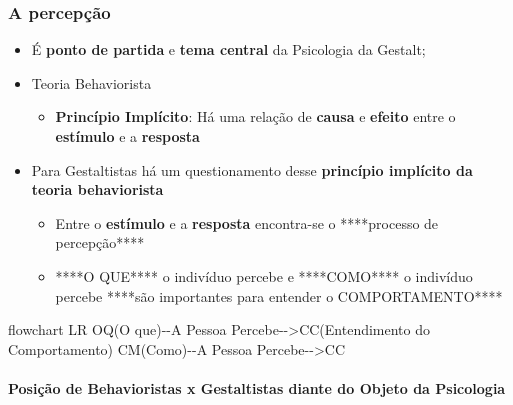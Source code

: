 \documentclass[
]{book}
\newenvironment{Shaded}{\begin{snugshade}}{\end{snugshade}}
\newcommand{\NormalTok}[1]{#1}
\providecommand{\tightlist}{%
  \setlength{\itemsep}{0pt}\setlength{\parskip}{0pt}}
\begin{document}
\hypertarget{a-percepuxe7uxe3o}{%
\subsubsection{A percepção}\label{a-percepuxe7uxe3o}}

\begin{itemize}
\tightlist
\item
  É \textbf{ponto de partida} e \textbf{tema central} da Psicologia da Gestalt;
\item
  Teoria Behaviorista

  \begin{itemize}
  \tightlist
  \item
    \textbf{Princípio Implícito}: Há uma relação de \textbf{causa} e \textbf{efeito} entre o \textbf{estímulo} e a \textbf{resposta}
  \end{itemize}
\item
  Para Gestaltistas há um questionamento desse \textbf{princípio implícito da teoria behaviorista}

  \begin{itemize}
  \tightlist
  \item
    Entre o \textbf{estímulo} e a \textbf{resposta} encontra-se o ****processo de percepção****
  \item
    ****O QUE**** o indivíduo percebe e ****COMO**** o indivíduo percebe ****são importantes para entender o COMPORTAMENTO****
  \end{itemize}
\end{itemize}

\begin{Shaded}
\begin{Highlighting}[]
\NormalTok{flowchart LR}
\NormalTok{OQ(O que){-}{-}A Pessoa Percebe{-}{-}\textgreater{}CC(Entendimento do Comportamento)}
\NormalTok{CM(Como){-}{-}A Pessoa Percebe{-}{-}\textgreater{}CC}
\end{Highlighting}
\end{Shaded}

\hypertarget{posiuxe7uxe3o-de-behavioristas-x-gestaltistas-diante-do-objeto-da-psicologia}{%
\paragraph{Posição de Behavioristas x Gestaltistas diante do Objeto da Psicologia}\label{posiuxe7uxe3o-de-behavioristas-x-gestaltistas-diante-do-objeto-da-psicologia}}
\end{document}
